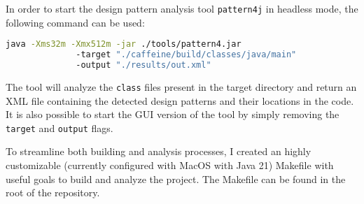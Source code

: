 \pagebreak

\noindent In order to start the design pattern analysis tool \texttt{pattern4j} in headless mode, the following command can be used:

\begin{lstlisting}[language=bash, caption={Bash command to start the pattern4j design pattern analysis in headless mode}]
            java -Xms32m -Xmx512m -jar ./tools/pattern4.jar
              -target "./caffeine/build/classes/java/main"
              -output "./results/out.xml"
\end{lstlisting}

\noindent The tool will analyze the \texttt{class} files present in the target directory and return an XML file containing the detected design patterns and their locations in the code. It is also possible to start the GUI version of the tool by simply removing the \texttt{target} and \texttt{output} flags.

To streamline both building and analysis processes, I created an highly customizable (currently configured with MacOS with Java 21) Makefile with useful goals to build and analyze the project. The Makefile can be found in the root of the repository.

